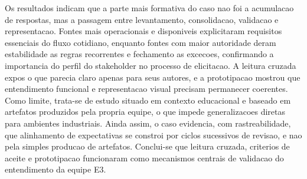 ﻿\documentclass[12pt]{article}
\begin{document}
%
%
Os resultados indicam que a parte mais formativa do caso nao foi a acumulacao de respostas, mas a passagem entre levantamento, consolidacao, validacao e representacao. Fontes mais operacionais e disponiveis explicitaram requisitos essenciais do fluxo cotidiano, enquanto fontes com maior autoridade deram estabilidade as regras recorrentes e fechamento as excecoes, confirmando a importancia do perfil do stakeholder no processo de elicitacao. A leitura cruzada expos o que parecia claro apenas para seus autores, e a prototipacao mostrou que entendimento funcional e representacao visual precisam permanecer coerentes. Como limite, trata-se de estudo situado em contexto educacional e baseado em artefatos produzidos pela propria equipe, o que impede generalizacoes diretas para ambientes industriais. Ainda assim, o caso evidencia, com rastreabilidade, que alinhamento de expectativas se constroi por ciclos sucessivos de revisao, e nao pela simples producao de artefatos. Conclui-se que leitura cruzada, criterios de aceite e prototipacao funcionaram como mecanismos centrais de validacao do entendimento da equipe E3.
\end{document}
